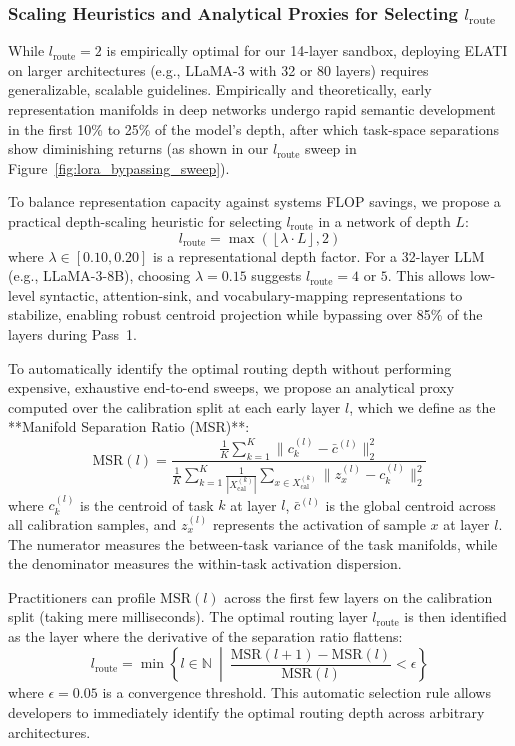 \subsubsection{Scaling Heuristics and Analytical Proxies for Selecting $l_{\text{route}}$}
While $l_{\text{route}} = 2$ is empirically optimal for our 14-layer sandbox, deploying ELATI on larger architectures (e.g., LLaMA-3 with 32 or 80 layers) requires generalizable, scalable guidelines. Empirically and theoretically, early representation manifolds in deep networks undergo rapid semantic development in the first 10\% to 25\% of the model's depth, after which task-space separations show diminishing returns (as shown in our $l_{\text{route}}$ sweep in Figure~\ref{fig:lora_bypassing_sweep}). 

To balance representation capacity against systems FLOP savings, we propose a practical depth-scaling heuristic for selecting $l_{\text{route}}$ in a network of depth $L$:
\begin{equation}
    l_{\text{route}} = \max\left( \left\lfloor \lambda \cdot L \right\rfloor, 2 \right)
\end{equation}
where $\lambda \in [0.10, 0.20]$ is a representational depth factor. For a 32-layer LLM (e.g., LLaMA-3-8B), choosing $\lambda = 0.15$ suggests $l_{\text{route}} = 4$ or $5$. This allows low-level syntactic, attention-sink, and vocabulary-mapping representations to stabilize, enabling robust centroid projection while bypassing over 85\% of the layers during Pass~1.

To automatically identify the optimal routing depth without performing expensive, exhaustive end-to-end sweeps, we propose an analytical proxy computed over the calibration split at each early layer $l$, which we define as the **Manifold Separation Ratio (MSR)**:
\begin{equation}
    \text{MSR}(l) = \frac{\frac{1}{K} \sum_{k=1}^K \|c_k^{(l)} - \bar{c}^{(l)}\|_2^2}{\frac{1}{K} \sum_{k=1}^K \frac{1}{|X_{\text{cal}}^{(k)}|} \sum_{x \in X_{\text{cal}}^{(k)}} \|z_x^{(l)} - c_k^{(l)}\|_2^2}
\end{equation}
where $c_k^{(l)}$ is the centroid of task $k$ at layer $l$, $\bar{c}^{(l)}$ is the global centroid across all calibration samples, and $z_x^{(l)}$ represents the activation of sample $x$ at layer $l$. The numerator measures the between-task variance of the task manifolds, while the denominator measures the within-task activation dispersion. 

Practitioners can profile $\text{MSR}(l)$ across the first few layers on the calibration split (taking mere milliseconds). The optimal routing layer $l_{\text{route}}$ is then identified as the layer where the derivative of the separation ratio flattens:
\begin{equation}
    l_{\text{route}} = \min \left\{ l \in \mathbb{N} \ \middle|\ \frac{\text{MSR}(l+1) - \text{MSR}(l)}{\text{MSR}(l)} < \epsilon \right\}
\end{equation}
where $\epsilon = 0.05$ is a convergence threshold. This automatic selection rule allows developers to immediately identify the optimal routing depth across arbitrary architectures.

